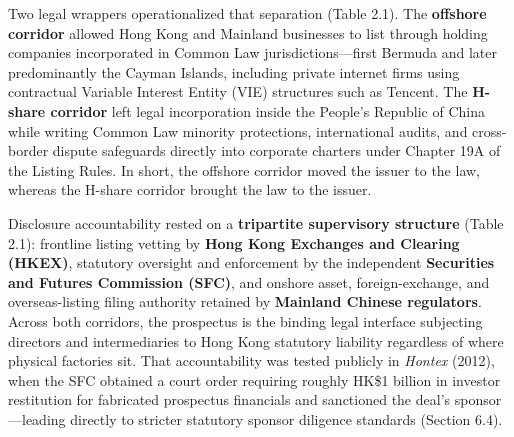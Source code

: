 \documentclass[11pt,letterpaper]{article}
\begin{document}
Two legal wrappers operationalized that separation (Table 2.1). The \textbf{offshore corridor} allowed Hong Kong and Mainland businesses to list through holding companies incorporated in Common Law jurisdictions—first Bermuda and later predominantly the Cayman Islands, including private internet firms using contractual Variable Interest Entity (VIE) structures such as Tencent. The \textbf{H-share corridor} left legal incorporation inside the People's Republic of China while writing Common Law minority protections, international audits, and cross-border dispute safeguards directly into corporate charters under Chapter 19A of the Listing Rules. In short, the offshore corridor moved the issuer to the law, whereas the H-share corridor brought the law to the issuer.

Disclosure accountability rested on a \textbf{tripartite supervisory structure} (Table 2.1): frontline listing vetting by \textbf{Hong Kong Exchanges and Clearing (HKEX)}, statutory oversight and enforcement by the independent \textbf{Securities and Futures Commission (SFC)}, and onshore asset, foreign-exchange, and overseas-listing filing authority retained by \textbf{Mainland Chinese regulators}. Across both corridors, the prospectus is the binding legal interface subjecting directors and intermediaries to Hong Kong statutory liability regardless of where physical factories sit. That accountability was tested publicly in \textit{Hontex} (2012), when the SFC obtained a court order requiring roughly HK\$1 billion in investor restitution for fabricated prospectus financials and sanctioned the deal's sponsor—leading directly to stricter statutory sponsor diligence standards (Section 6.4).
\end{document}
